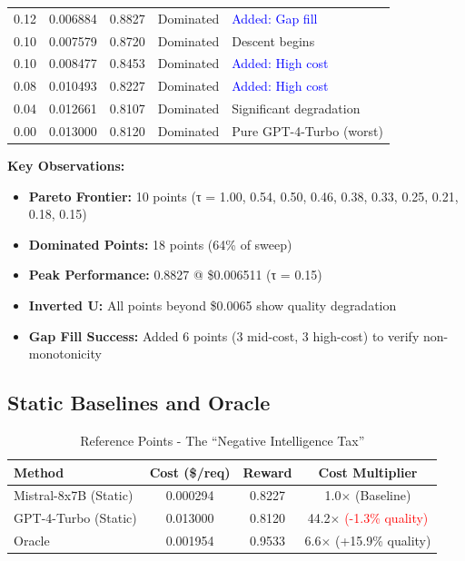 \begin{table}[H]
\begin{tabular}{ccccl}
0.12 & 0.006884 & 0.8827 & Dominated & \textcolor{blue}{Added: Gap fill} \\
0.10 & 0.007579 & 0.8720 & Dominated & Descent begins \\
0.10 & 0.008477 & 0.8453 & Dominated & \textcolor{blue}{Added: High cost} \\
0.08 & 0.010493 & 0.8227 & Dominated & \textcolor{blue}{Added: High cost} \\
0.04 & 0.012661 & 0.8107 & Dominated & Significant degradation \\
0.00 & 0.013000 & 0.8120 & Dominated & Pure GPT-4-Turbo (worst) \\
\bottomrule
\end{tabular}
\end{table}

\textbf{Key Observations:}
\begin{itemize}
    \item \textbf{Pareto Frontier:} 10 points (τ = 1.00, 0.54, 0.50, 0.46, 0.38, 0.33, 0.25, 0.21, 0.18, 0.15)
    \item \textbf{Dominated Points:} 18 points (64\% of sweep)
    \item \textbf{Peak Performance:} 0.8827 @ \$0.006511 (τ = 0.15)
    \item \textbf{Inverted U:} All points beyond \$0.0065 show quality degradation
    \item \textbf{Gap Fill Success:} Added 6 points (3 mid-cost, 3 high-cost) to verify non-monotonicity
\end{itemize}

\subsection*{Static Baselines and Oracle}

\begin{table}[H]
\centering
\caption{Reference Points - The ``Negative Intelligence Tax''}
\label{tab:references}
\begin{tabular}{lccc}
\toprule
\textbf{Method} & \textbf{Cost (\$/req)} & \textbf{Reward} & \textbf{Cost Multiplier} \\
\midrule
Mistral-8x7B (Static) & 0.000294 & 0.8227 & 1.0$\times$ (Baseline) \\
GPT-4-Turbo (Static) & 0.013000 & 0.8120 & 44.2$\times$ \textcolor{red}{(-1.3\% quality)} \\
Oracle & 0.001954 & 0.9533 & 6.6$\times$ (+15.9\% quality) \\
\bottomrule
\end{tabular}
\end{table}

